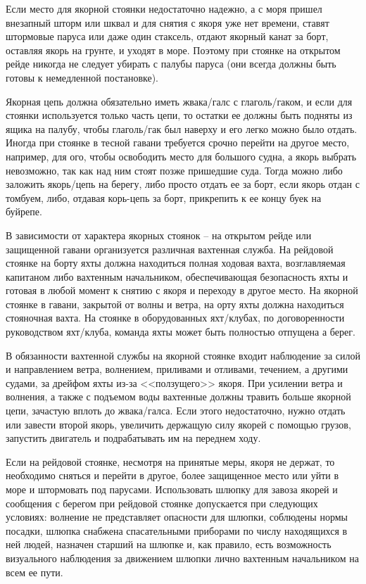 \documentclass[a4paper, 12pt, twoside, final, book, russian, fittopage, cyremdash]{ncc}
\begin{document}
Если место для якорной стоянки недостаточно надежно, а с моря пришел внезапный шторм или шквал и для снятия с якоря уже нет времени, ставят штормовые паруса или даже один стаксель, отдают якорный канат за борт, оставляя якорь на грунте, и уходят в море. Поэтому при стоянке на открытом рейде никогда не следует убирать с палубы паруса (они всегда должны быть готовы к немедленной постановке).

Якорная цепь должна обязательно иметь жвака\-/галс с глаголь\-/гаком, и если для стоянки используется только часть цепи, то остатки ее должны быть подняты из ящика на палубу, чтобы глаголь\-/гак был наверху и его легко можно было отдать. Иногда при стоянке в тесной гавани требуется срочно перейти на другое место, например, для ого, чтобы освободить место для большого судна, а якорь выбрать невозможно, так как над ним стоят позже пришедшие суда. Тогда можно либо заложить якорь\-/цепь на берегу, либо просто отдать ее за борт, если якорь отдан с томбуем, либо, отдавая корь-цепь за борт, прикрепить к ее концу буек на буйрепе. 

В зависимости от характера якорных стоянок \--- на открытом рейде или защищенной гавани организуется различная вахтенная служба. На рейдовой стоянке на борту яхты должна находиться полная ходовая вахта, возглавляемая капитаном либо вахтенным начальником, обеспечивающая безопасность яхты и готовая в любой момент к снятию с якоря и переходу в другое место. На якорной стоянке в гавани, закрытой от волны и ветра, на орту яхты должна находиться стояночная вахта. На стоянке в оборудованных яхт\-/клубах, по договоренности руководством яхт\-/клуба, команда яхты может быть полностью отпущена а берег.

В обязанности вахтенной службы на якорной стоянке входит наблюдение за силой и направлением ветра, волнением, приливами и отливами, течением, а другими судами, за дрейфом яхты из-за <<ползущего>> якоря. При усилении ветра и волнения, а также с подъемом воды вахтенные должны травить больше якорной цепи, зачастую вплоть до жвака\-/галса. Если этого недостаточно, нужно отдать или завести второй якорь, увеличить держащую силу якорей с помощью грузов, запустить двигатель и подрабатывать им на переднем ходу.

Если на рейдовой стоянке, несмотря на принятые меры, якоря не держат, то необходимо сняться и перейти в другое, более защищенное место или уйти в море и штормовать под парусами. Использовать шлюпку для завоза якорей и сообщения с берегом при рейдовой стоянке допускается при следующих условиях: волнение не представляет опасности для шлюпки, соблюдены нормы посадки, шлюпка снабжена спасательными приборами по числу находящихся в ней людей, назначен старший на шлюпке и, как правило, есть возможность визуального наблюдения за движением шлюпки лично вахтенным начальником на всем ее пути. 
\end{document}
